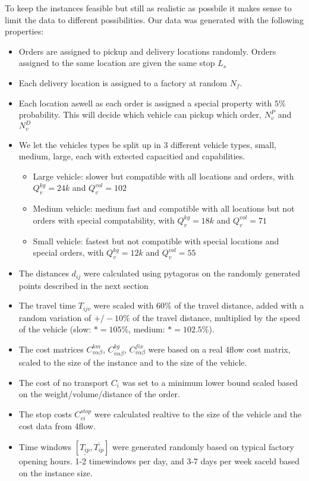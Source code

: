 \documentclass[../main.tex]{subfiles}
\begin{document}
\par
To keep the instances feasible but still as realistic as possbile it makes sense to limit the data to different possibilities.
Our data was generated with the following properties:
\begin{itemize}
    \item Orders are assigned to pickup and delivery locations randomly. Orders assigned to the same location are given the same stop $L_s$
    \item Each delivery location is assigned to a factory at random $N_f$.
    \item Each location aswell as each order is assigned a special property with $5\%$ probability. This will decide which vehicle can pickup which order, $N^P_v$ and $N^D_v$
    \item We let the vehicles types be split up in 3 different vehicle types, small, medium, large, each with extected capacitied and capabilities.
        \begin{itemize}
            \item Large vehicle: slower but compatible with all locations and orders, with $Q^{kg}_v=24k$ and $Q^{vol}_v=102$
            \item Medium vehicle: medium fast and compatible with all locations but not orders with special compatability, with $Q^{kg}_v=18k$ and $Q^{vol}_v=71$ 
            \item Small vehicle: fastest but not compatible with special locations and special orders, with $Q^{kg}_v=12k$ and $Q^{vol}_v=55$ 
        \end{itemize}
    \item The distances $d_{ij}$ were calculated using pytagoras on the randomly generated points described in the next section 
    \item The travel time $T_{ijv}$ were scaled with $60\%$ of the travel distance, added with a random variation of $+/- 10\%$ of the travel distance, multiplied by the speed of the vehicle (slow: $*=105\%$, medium: $*=102.5\%$).
    \item The cost matrices $C^{km}_{v\alpha\beta}$, $C^{kg}_{v\alpha\beta}$, $C^{fix}_{v\alpha\beta}$ were based on a real 4flow cost matrix, scaled to the size of the instance and to the size of the vehicle.  
    \item The cost of no transport $C_i$ was set to a minimum lower bound scaled based on the weight/volume/distance of the order.
    \item The stop costs $C^{stop}_{vi}$ were calculated realtive to the size of the vehicle and the cost data from 4flow.
    \item Time windows $[\underline{T_{ip}},\overline{T_{ip}}]$  were generated randomly based on typical factory opening hours. 1-2 timewindows per day, and 3-7 days per week saceld based on the instance size. 
\end{itemize}
\end{document}
